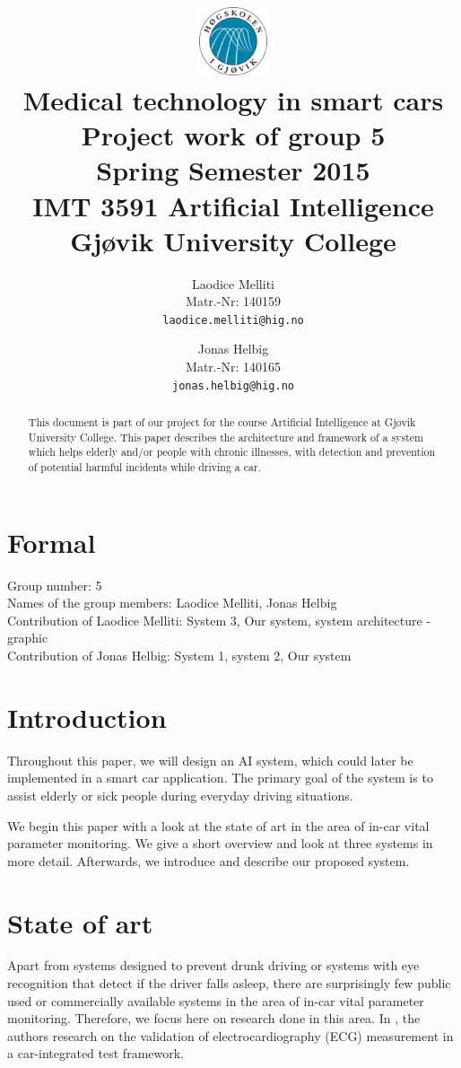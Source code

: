\documentclass[a4paper]{article}
\title{								%
	\includegraphics[height=2cm]{images/higlogo}\\\vspace{1cm}	%
	Medical technology in smart cars\\\vspace{7mm}
	\Large{Project work of group 5}\\\vspace{5mm}
	\normalsize{Spring Semester 2015}\\\vspace{1cm}
	\large{IMT 3591 Artificial Intelligence\\
		Gj\o{}vik University College
		\\\vspace{1cm}}}
\author{			%
Laodice Melliti\\
Matr.-Nr: 140159\\
{\tt laodice.melliti@hig.no}
\and 
Jonas Helbig\\
Matr.-Nr: 140165\\
{\tt jonas.helbig@hig.no}
\vspace{1cm}}
\begin{document}
	
\maketitle				%
\thispagestyle{empty} 	%
\begin{abstract}		%
	This document is part of our project for the course Artificial Intelligence at Gj\o{}vik University College. This paper describes the architecture and framework of a system which helps elderly and/or people with chronic illnesses, with detection and prevention of potential harmful incidents while driving a car. 
\end{abstract}

\newpage				%
\tableofcontents		%
\newpage
\section{Formal}
Group number: 5\\
Names of the group members: Laodice Melliti, Jonas Helbig\\
Contribution of Laodice Melliti: System 3, Our system, system architecture - graphic\\
Contribution of Jonas Helbig: System 1, system 2, Our system \\
\section{Introduction}
\indent
\indent Throughout this paper, we will design an AI system, which could later be implemented in a smart car application. The primary goal of the system is to assist elderly or sick people during everyday driving situations.

We begin this paper with a look at  the state of art in the area of in-car vital parameter monitoring. We give a short overview and look at three systems in more detail. Afterwards, we introduce and describe our proposed system.
\section{State of art}
\indent
\indent Apart from systems designed to prevent drunk driving or systems with eye recognition that detect if the driver falls asleep, there are surprisingly few public used or commercially available systems in the area of in-car vital parameter monitoring. Therefore, we focus here on research done in this area. In \cite{schneider:12}, the authors research on the validation of electrocardiography (ECG) measurement in a car-integrated test framework.
\end{document}
